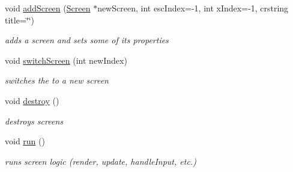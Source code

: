 \begin{DoxyCompactItemize}
\mbox{\label{classnta_1_1ScreenManager_a18659a2edcddd60d53094ac46ac0b0df}} 
void \hyperlink{classnta_1_1ScreenManager_a18659a2edcddd60d53094ac46ac0b0df}{add\+Screen} (\hyperlink{classnta_1_1Screen}{Screen} $\ast$new\+Screen, int esc\+Index=-\/1, int x\+Index=-\/1, crstring title=\char`\"{}\char`\"{})
\begin{DoxyCompactList}\small\item\em adds a screen and sets some of its properties \end{DoxyCompactList}\item 
\mbox{\label{classnta_1_1ScreenManager_a97edbb147671d2b94e1f5a13cb6f7660}} 
void \hyperlink{classnta_1_1ScreenManager_a97edbb147671d2b94e1f5a13cb6f7660}{switch\+Screen} (int new\+Index)
\begin{DoxyCompactList}\small\item\em switches the to a new screen \end{DoxyCompactList}\item 
\mbox{\label{classnta_1_1ScreenManager_ad4e28094d9293b55f38ea463ac802219}} 
void \hyperlink{classnta_1_1ScreenManager_ad4e28094d9293b55f38ea463ac802219}{destroy} ()
\begin{DoxyCompactList}\small\item\em destroys screens \end{DoxyCompactList}\item 
\mbox{\label{classnta_1_1ScreenManager_a19a9c4c96209d37d928c05777a1135b9}} 
void \hyperlink{classnta_1_1ScreenManager_a19a9c4c96209d37d928c05777a1135b9}{run} ()
\begin{DoxyCompactList}\small\item\em runs screen logic (render, update, handle\+Input, etc.) \end{DoxyCompactList}\end{DoxyCompactItemize}
